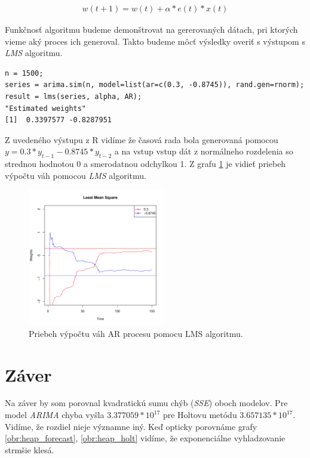 \documentclass[12pt,a4paper,oneside,final]{article}
\theoremstyle{definition}
\theoremstyle{remark}
\numberwithin{equation}{section}
\begin{document}
\begin{eqnarray} \label{lms}
    w(t+1) = w(t) + \alpha * e(t) * x(t)
\end{eqnarray}

Funkčnosť algoritmu budeme demonštrovat na gererovaných dátach, pri ktorých vieme 
aký proces ich generoval. Takto budeme môcť výsledky overiť s výstupom s \emph{LMS} algoritmu.

\begin{minipage}{\linewidth}
\begingroup
\fontsize{9pt}{7pt}\selectfont
\begin{verbatim}
n = 1500;
series = arima.sim(n, model=list(ar=c(0.3, -0.8745)), rand.gen=rnorm);
result = lms(series, alpha, AR);
"Estimated weights"
[1]  0.3397577 -0.8287951
\end{verbatim}
\endgroup
\end{minipage}

Z uvedeného výstupu z R vidíme že časová rada bola generovaná pomocou
$y = 0.3*y_{t-1} - 0.8745*y_{t-2}$ a na vstup vstup dát z normálneho rozdelenia so
strednou hodnotou 0 a smerodatnou odchylkou 1. Z grafu \ref{obr:lms} je vidieť priebeh
výpočtu váh pomocou \emph{LMS} algoritmu.

\begin{figure}[H]
    \begin{center}
        \includegraphics[width=.8\textwidth,height=6cm]{images/lms.pdf}
        \caption{Priebeh výpočtu váh AR procesu pomocu LMS algoritmu.}
        \label{obr:lms}
    \end{center}
\end{figure}

\section{Záver}
Na záver by som porovnal kvadratickú sumu chýb (\emph{SSE}) oboch modelov. Pre
model \emph{ARIMA} chyba vyšla $3.377059*10^17$ pre Holtovu metódu $3.657135*10^17$. 
Vidíme, že rozdiel nieje významne iný. Keď opticky porovnáme grafy \ref{obr:heap_forecast},
\ref{obr:heap_holt} vidíme, že exponenciálne vyhladzovanie strmšie klesá.
\end{document}
